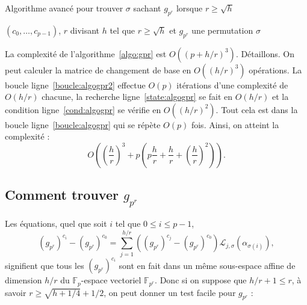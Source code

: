 \documentclass[a4paper, titlepage, 11pt]{article}
\theoremstyle{definition}
\theoremstyle{remark}
\def\O{O}
\def\gf #1{\mathbb{F}_{#1}}
\begin{document}
\begin{algorithm}[h]
\caption{Algorithme avancé pour trouver $\sigma$ sachant $g_{p^r}$ lorsque $r\geqslant \sqrt h$}
\label{algo:gpr}
\begin{algorithmic}[1]
\REQUIRE $(c_0,\dots, c_{p-1})$, $r$ divisant $h$ tel que $r\geqslant \sqrt h$ et $g_{p^r}$
\ENSURE une permutation $\sigma$
\FORALL{$\nu$ dans $\gf{p}$}\label{boucle:algogpr}
	\label{boucle:algogpr2}
	\ENDFOR
	\label{state:algogpr}
	\label{cond:algogpr}
		\RETURN{$\sigma$}
	\ENDIF
\ENDFOR
\end{algorithmic}
\end{algorithm}

La complexité de l'algorithme~\ref{algo:gpr} est $\O\left((p+h/r)^3\right)$. Détaillons. On peut calculer la matrice de changement de base en $\O\left((h/r)^3\right)$ opérations. La boucle ligne~\ref{boucle:algogpr2} effectue $\O(p)$ itérations d'une complexité de $\O(h/r)$ chacune, la recherche ligne~\ref{state:algogpr} se fait en $\O(h/r)$ et la condition ligne~\ref{cond:algogpr} se vérifie en $\O\left((h/r)^2\right)$. Tout cela est dans la boucle ligne~\ref{boucle:algogpr} qui se répète $\O(p)$ fois. Ainsi, on atteint la complexité :
$$\O\left(\left(\frac{h}{r}\right)^3 + p\left( p\frac{h}{r} + \frac{h}{r} + \left(\frac{h}{r}\right)^2\right)\right).$$

\subsection{Comment trouver $g_{p^r}$}

Les équations, quel que soit $i$ tel que $0\leqslant i \leqslant p-1$,
$$(g_{p^r})^{c_i} - (g_{p^r})^{c_{0}} = \sum_{j=1}^{h/r} \left((g_{p^r})^{c_{j}} - (g_{p^r})^{c_{0}} \right) \mathcal L_{j,\sigma}(\alpha_{\sigma(i)}),$$
signifient que tous les $(g_{p^r})^{c_i}$ sont en fait dans un même sous-espace affine de dimension $h/r$ du $\gf{p}$-espace vectoriel $\gf{p^r}$. Donc si on suppose que $h/r + 1 \leqslant r$, à savoir $r \geqslant \sqrt{h + 1/4} + 1/2$, on peut donner un test facile pour $g_{p^r}$ :
\end{document}
